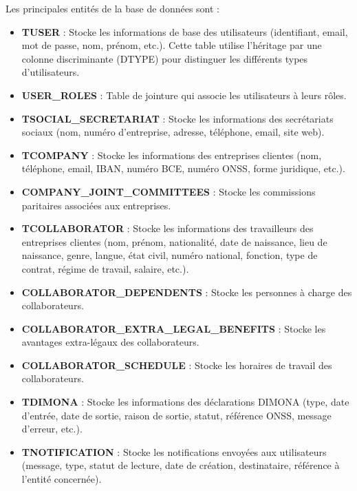 \vspace{0.5cm}

\noindent Les principales entités de la base de données sont :

\begin{itemize}[leftmargin=*,label=\textcolor{darkgray}{$\bullet$},itemsep=0.3em]
  \item \textbf{TUSER} : Stocke les informations de base des utilisateurs (identifiant, email, mot de passe, nom, prénom, etc.). Cette table utilise l'héritage par une colonne discriminante (DTYPE) pour distinguer les différents types d'utilisateurs.

  \item \textbf{USER\_ROLES} : Table de jointure qui associe les utilisateurs à leurs rôles.

  \item \textbf{TSOCIAL\_SECRETARIAT} : Stocke les informations des secrétariats sociaux (nom, numéro d'entreprise, adresse, téléphone, email, site web).

  \item \textbf{TCOMPANY} : Stocke les informations des entreprises clientes (nom, téléphone, email, IBAN, numéro BCE, numéro ONSS, forme juridique, etc.).

  \item \textbf{COMPANY\_JOINT\_COMMITTEES} : Stocke les commissions paritaires associées aux entreprises.

  \item \textbf{TCOLLABORATOR} : Stocke les informations des travailleurs des entreprises clientes (nom, prénom, nationalité, date de naissance, lieu de naissance, genre, langue, état civil, numéro national, fonction, type de contrat, régime de travail, salaire, etc.).

  \item \textbf{COLLABORATOR\_DEPENDENTS} : Stocke les personnes à charge des collaborateurs.

  \item \textbf{COLLABORATOR\_EXTRA\_LEGAL\_BENEFITS} : Stocke les avantages extra-légaux des collaborateurs.

  \item \textbf{COLLABORATOR\_SCHEDULE} : Stocke les horaires de travail des collaborateurs.

  \item \textbf{TDIMONA} : Stocke les informations des déclarations DIMONA (type, date d'entrée, date de sortie, raison de sortie, statut, référence ONSS, message d'erreur, etc.).
  
  \item \textbf{TNOTIFICATION} : Stocke les notifications envoyées aux utilisateurs (message, type, statut de lecture, date de création, destinataire, référence à l'entité concernée).
\end{itemize}

